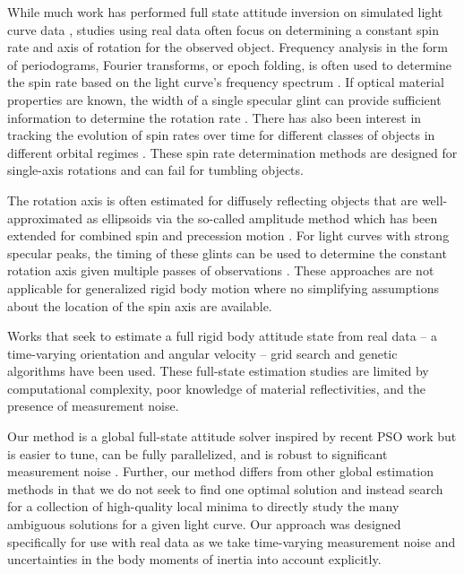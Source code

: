 \documentclass[a4paper,twocolumn]{spaceDebrisC} %
\begin{document}
While much work has performed full state attitude inversion on simulated light curve data \cite{burton2024journal, gagnon2024, robinson2025att}, studies using real data often focus on determining a constant spin rate and axis of rotation for the observed object. Frequency analysis in the form of periodograms, Fourier transforms, or epoch folding, is often used to determine the spin rate based on the light curve's frequency spectrum \cite{silha2015, silha2021, isoletta2024, schildknecht2015, pittet2017, yanagisawa2012, koshkin2018}. If optical material properties are known, the width of a single specular glint can provide sufficient information to determine the rotation rate \cite{hinks2016}. There has also been interest in tracking the evolution of spin rates over time for different classes of objects in different orbital regimes \cite{koshkin2018, blacketer2022, karpov2016}. These spin rate determination methods are designed for single-axis rotations and can fail for tumbling objects.

The rotation axis is often estimated for diffusely reflecting objects that are well-approximated as ellipsoids via the so-called amplitude method \cite{williams1979location} which has been extended for combined spin and precession motion \cite{yanagisawa2012}. For light curves with strong specular peaks, the timing of these glints can be used to determine the constant rotation axis given multiple passes of observations \cite{vananti2023, koshkin2018}. These approaches are not applicable for generalized rigid body motion where no simplifying assumptions about the location of the spin axis are available.

Works that seek to estimate a full rigid body attitude state from real data -- a time-varying orientation and angular velocity -- grid search \cite{shafer2017} and genetic algorithms \cite{piergentili2020, gallucci2020} have been used. These full-state estimation studies are limited by computational complexity, poor knowledge of material reflectivities, and the presence of measurement noise. 

Our method is a global full-state attitude solver inspired by recent PSO work \cite{burton2024journal} but is easier to tune, can be fully parallelized, and is robust to significant measurement noise \cite{robinson2025att}. Further, our method differs from other global estimation methods in that we do not seek to find one optimal solution and instead search for a collection of high-quality local minima to directly study the many ambiguous solutions for a given light curve. Our approach was designed specifically for use with real data as we take time-varying measurement noise and uncertainties in the body moments of inertia into account explicitly. 
\end{document}
